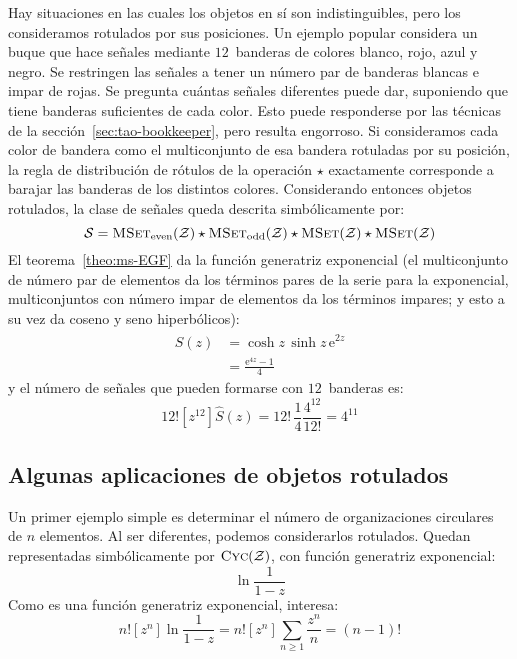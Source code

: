   Hay situaciones en las cuales los objetos en sí
  son indistinguibles,
  pero los consideramos rotulados por sus posiciones.
  Un ejemplo popular considera un buque que hace señales
  mediante \(12\)~banderas de colores blanco, rojo, azul y negro.
  Se restringen las señales
  a tener un número par de banderas blancas
  e impar de rojas.
  Se pregunta cuántas señales diferentes puede dar,
  suponiendo que tiene banderas suficientes de cada color.
  Esto puede responderse por las técnicas
  de la sección~\ref{sec:tao-bookkeeper},
  pero resulta engorroso.
  Si consideramos cada color de bandera
  como el multiconjunto de esa bandera rotuladas por su posición,
  la regla de distribución de rótulos de la operación \(\star\)
  exactamente corresponde
  a barajar las banderas de los distintos colores.
  Considerando entonces objetos rotulados,
  la clase de señales queda descrita simbólicamente por:
  \begin{equation*}
    \mathcal{S}
      = \operatorname{\textsc{MSet}}_{\text{even}} (\mathcal{Z})
	  \star \operatorname{\textsc{MSet}}_{\text{odd}} (\mathcal{Z})
	  \star \operatorname{\textsc{MSet}}(\mathcal{Z})
	  \star \operatorname{\textsc{MSet}}(\mathcal{Z})
  \end{equation*}
  El teorema~\ref{theo:ms-EGF} da la función generatriz exponencial
  (el multiconjunto de número par de elementos da los términos pares
   de la serie para la exponencial,
   multiconjuntos con número impar
   de elementos da los términos impares;
   y esto a su vez da coseno y seno hiperbólicos):
  \begin{align*}
    \widehat{S}(z)
      &= \cosh z \, \sinh z \, \mathrm{e}^{2 z} \\
      &= \frac{\mathrm{e}^{4 z} - 1}{4}
  \end{align*}
  y el número de señales que pueden formarse con \(12\)~banderas es:
  \begin{equation*}
    12! \left[ z^{12} \right] \widehat{S}(z)
      = 12! \, \frac{1}{4} \frac{4^{12}}{12!}
      = 4^{11}
  \end{equation*}

\subsection{Algunas aplicaciones de objetos rotulados}
\label{sec:ms-egf-aplicaciones}

  Un primer ejemplo simple
  es determinar
  el número de organizaciones circulares de \(n\) elementos.
  Al ser diferentes,
  podemos considerarlos rotulados.
  Quedan representadas simbólicamente por \(\operatorname{\textsc{Cyc}}(\mathcal{Z})\),
  con función generatriz exponencial:
  \begin{equation*}
    \ln \frac{1}{1 - z}
  \end{equation*}
  Como es una función generatriz exponencial,
  interesa:
  \begin{equation*}
    n! \left[ z^n \right] \ln \frac{1}{1 - z}
      = n! \left[ z^n \right] \sum_{n \ge 1} \frac{z^n}{n}
      = (n - 1)!
  \end{equation*}


